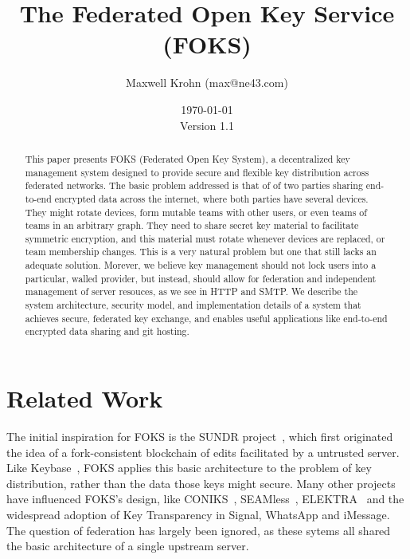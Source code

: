 \documentclass[11pt]{article}
\title{The Federated Open Key Service (FOKS)}
\author{Maxwell Krohn (max@ne43.com)}
\date{\today\\Version 1.1}
\begin{document}
\newcommand{\yubi}{Yubikey}
\newcommand{\Yubi}{Yubikey}
\newcommand{\yubis}{Yubikeys}
\newcommand{\Yubis}{Yubikeys}

\maketitle

\begin{abstract}

This paper presents FOKS (Federated Open Key System), a
decentralized key management system designed to provide secure and flexible key
distribution across federated networks. The basic problem addressed is that of
of two parties sharing end-to-end encrypted data across the internet, where both
parties have several devices. They might rotate devices, form mutable teams with
other users, or even teams of teams in an arbitrary graph. They need to share
secret key material to facilitate symmetric encryption, and this material must
rotate whenever devices are replaced, or team membership changes.  This is a
very natural problem but one that still lacks an adequate solution.  Morever, we
believe key management should not lock users into a particular, walled provider,
but instead, should allow for federation and independent management of server
resouces, as we see in HTTP and SMTP.  We describe the system architecture,
security model, and implementation details of a system that achieves secure,
federated key exchange, and enables useful applications like end-to-end
encrypted data sharing and git hosting.

\end{abstract}











\section{Related Work}

The initial inspiration for FOKS is the SUNDR project~\cite{sundr}, which first
originated the idea of a fork-consistent blockchain of edits facilitated by a
untrusted server.  Like Keybase~\cite{keybase}, FOKS applies this basic
architecture to the problem of key distribution, rather than the data those keys
might secure. Many other projects have influenced FOKS's design, like
CONIKS~\cite{melara2015coniks}, SEAMless~\cite{chase2019seemless}, 
ELEKTRA~\cite{cryptoeprint:2024/107} and the widespread adoption of Key
Transparency in Signal, WhatsApp and iMessage. The question of federation has
largely been ignored, as these sytems all shared the basic architecture of a
single upstream server.
\end{document}
